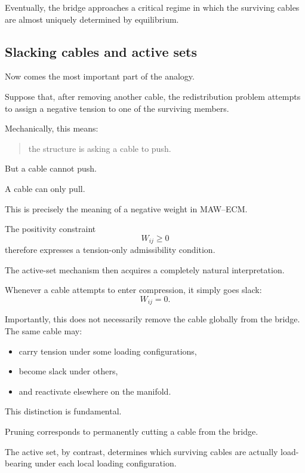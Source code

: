 \documentclass[11pt,a4paper]{article}
\begin{document}
Eventually, the bridge approaches a critical regime in which the surviving
cables are almost uniquely determined by equilibrium.

\subsection{Slacking cables and active sets}

Now comes the most important part of the analogy.

Suppose that, after removing another cable, the redistribution problem attempts
to assign a negative tension to one of the surviving members.

Mechanically, this means:
\begin{quote}
the structure is asking a cable to push.
\end{quote}

But a cable cannot push.

A cable can only pull.

This is precisely the meaning of a negative weight in MAW--ECM.

The positivity constraint
\[
        W_{ij}\ge0
\]
therefore expresses a tension-only admissibility condition.

The active-set mechanism then acquires a completely natural interpretation.

Whenever a cable attempts to enter compression, it simply goes slack:
\[
        W_{ij}=0.
\]

Importantly, this does not necessarily remove the cable globally from the
bridge. The same cable may:
\begin{itemize}
    \item carry tension under some loading configurations,
    \item become slack under others,
    \item and reactivate elsewhere on the manifold.
\end{itemize}

This distinction is fundamental.

Pruning corresponds to permanently cutting a cable from the bridge.

The active set, by contrast, determines which surviving cables are actually
load-bearing under each local loading configuration.

\end{document}
